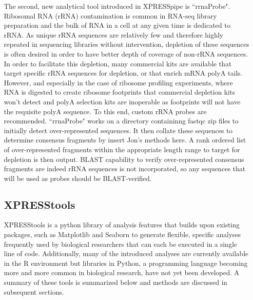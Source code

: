 \documentclass[11pt, a4paper, oneside]{article}
\begin{document}
The second, new analytical tool introduced in XPRESSpipe is ``rrnaProbe". Ribosomal RNA (rRNA) contamination is common in RNA-seq library preparation and the bulk of RNA in a cell at any given time is dedicated to rRNA. As unique rRNA sequences are relatively few and therefore highly repeated in sequencing libraries without intervention, depletion of these sequences is often desired in order to have better depth of coverage of non-rRNA sequences. In order to facilitate this depletion, many commercial kits are available that target specific rRNA sequences for depletion, or that enrich mRNA polyA tails. However, and especially in the case of ribosome profiling experiments, where RNA is digested to create ribosome footprints that commercial depletion kits won't detect and polyA selection kits are inoperable as footprints will not have the requisite polyA sequence. To this end, custom rRNA probes are recommended{}. ``rrnaProbe" works on a directory containinng fastqc{} zip files to initially detect over-represented sequences. It then collate these sequences to determine consensus fragments by {insert Jon's methods here}. A rank ordered list of over-represented fragments within the appropriate length range to target for depletion is then output. BLAST capability to verify over-represented consensus fragments are indeed rRNA sequences is not incorporated, so any sequences that will be used as probes should be BLAST-verified.

\subsection{XPRESStools}
XPRESStools is a python library of analysis features that builds upon existing packages, such as Matplotlib{} and Seaborn{} to generate flexible, specific analyses frequently used by biological researchers that can each be executed in a single line of code. Additionally, many of the introduced analyses are currently available in the R environment but libraries in Python, a programming language becoming more and more common in biological research, have not yet been developed. A summary of these tools is summarized below and methods are discussed in subsequent sections.
\end{document}
